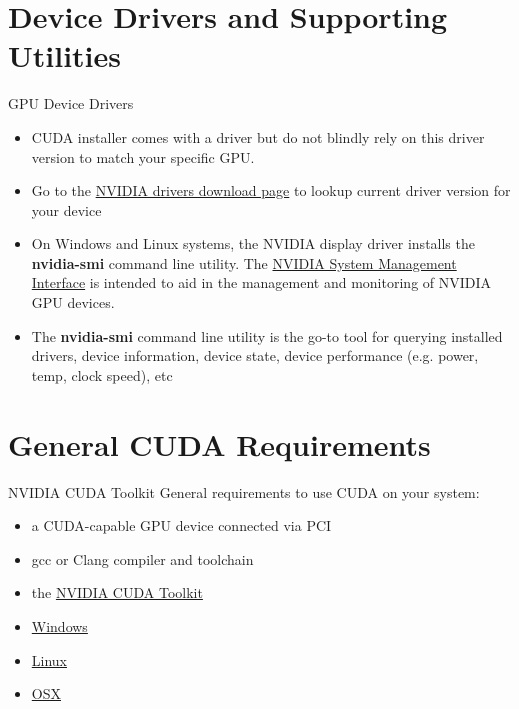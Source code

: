 \documentclass[handout]{beamer}
\begin{document}
\section{Device Drivers and Supporting Utilities}
\begin{frame}{GPU Device Drivers}
\begin{itemize}
	\item<1->CUDA installer comes with a driver but do not blindly rely on this driver version to match your specific GPU.
	\item<2->Go to the \href{http://www.nvidia.com/Download/index.aspx}{\color{blue}NVIDIA drivers download page} to lookup current driver version for your device
	\item<3-> On Windows and Linux systems, the NVIDIA display driver installs the \textbf{{\selectfont nvidia-smi}} command line utility.  The \href{https://developer.nvidia.com/nvidia-system-management-interface}{NVIDIA \color{blue} System Management Interface} is intended to aid in the management and monitoring of NVIDIA GPU devices.
	\item<4->The \textbf{{\selectfont nvidia-smi}} command line utility is the go-to tool for querying installed drivers, device information, device state, device performance (e.g. power, temp, clock speed), etc 
\end{itemize}
\end{frame}

\section{General CUDA Requirements}
\begin{frame}{NVIDIA CUDA Toolkit}
General requirements to use CUDA on your system:
\begin{itemize}
	\item<1-> a CUDA-capable GPU device connected via PCI
	\item<1->gcc or Clang compiler and toolchain
	\item<1->the \href{https://developer.nvidia.com/cuda-toolkit}{\color{blue}NVIDIA CUDA Toolkit}
\end{itemize}
\hfill \break
{} 
\begin{itemize}
	\item<2->\href{http://docs.nvidia.com/cuda/cuda-getting-started-guide-for-microsoft-windows}{\color{blue}Windows}
	\item<2->\href{http://docs.nvidia.com/cuda/cuda-getting-started-guide-for-linux}{\color{blue}Linux}
	\item<2->\href{http://docs.nvidia.com/cuda/cuda-getting-started-guide-for-mac-os-x}{\color{blue}OSX}
\end{itemize}
\end{frame}
\end{document}
